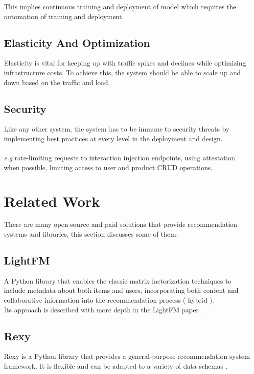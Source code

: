 This implies continuous training and deployment of model which requires the automation of training and deployment.

\subsection{Elasticity And Optimization}

Elasticity is vital for keeping up with traffic spikes and declines while optimizing infrastructure costs. To achieve this, the system should be able to scale up and down based on the traffic and load.

\subsection{Security}

Like any other system, the system has to be immune to security threats by implementing best practices at every level in the deployment and design. \\ \\
\textit{e.g} rate-limiting requests to interaction injection endpoints, using attestation when possible, limiting access to user and product CRUD operations.
 
\section{Related Work}

There are many open-source and paid solutions that provide recommendation systems and libraries, this section discusses some of them.

\subsection{LightFM}
A Python library that enables the classic matrix factorization techniques to include metadata about both items and users, incorporating both content and collaborative information into the recommendation process ( hybrid ). \cite{LightFM} \\

Its approach is described with more depth in the LightFM paper \cite{kula2015metadata}.

\subsection{Rexy}
Rexy\cite{Rexy} is a Python library that provides a general-purpose recommendation system framework. It is flexible and can be adapted to a variety of data schemas \cite{Rexy}.


